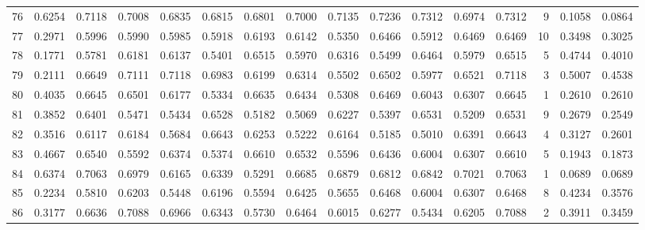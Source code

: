 \begin{tabular}{lrrrrrrrrrrrrrrr}
76  &      0.6254 &  0.7118 &  0.7008 &  0.6835 &  0.6815 &  0.6801 &  0.7000 &  0.7135 &  0.7236 &  0.7312 &   0.6974 &     0.7312 &      9 &                    0.1058 &                     0.0864 \\
77  &      0.2971 &  0.5996 &  0.5990 &  0.5985 &  0.5918 &  0.6193 &  0.6142 &  0.5350 &  0.6466 &  0.5912 &   0.6469 &     0.6469 &     10 &                    0.3498 &                     0.3025 \\
78  &      0.1771 &  0.5781 &  0.6181 &  0.6137 &  0.5401 &  0.6515 &  0.5970 &  0.6316 &  0.5499 &  0.6464 &   0.5979 &     0.6515 &      5 &                    0.4744 &                     0.4010 \\
79  &      0.2111 &  0.6649 &  0.7111 &  0.7118 &  0.6983 &  0.6199 &  0.6314 &  0.5502 &  0.6502 &  0.5977 &   0.6521 &     0.7118 &      3 &                    0.5007 &                     0.4538 \\
80  &      0.4035 &  0.6645 &  0.6501 &  0.6177 &  0.5334 &  0.6635 &  0.6434 &  0.5308 &  0.6469 &  0.6043 &   0.6307 &     0.6645 &      1 &                    0.2610 &                     0.2610 \\
81  &      0.3852 &  0.6401 &  0.5471 &  0.5434 &  0.6528 &  0.5182 &  0.5069 &  0.6227 &  0.5397 &  0.6531 &   0.5209 &     0.6531 &      9 &                    0.2679 &                     0.2549 \\
82  &      0.3516 &  0.6117 &  0.6184 &  0.5684 &  0.6643 &  0.6253 &  0.5222 &  0.6164 &  0.5185 &  0.5010 &   0.6391 &     0.6643 &      4 &                    0.3127 &                     0.2601 \\
83  &      0.4667 &  0.6540 &  0.5592 &  0.6374 &  0.5374 &  0.6610 &  0.6532 &  0.5596 &  0.6436 &  0.6004 &   0.6307 &     0.6610 &      5 &                    0.1943 &                     0.1873 \\
84  &      0.6374 &  0.7063 &  0.6979 &  0.6165 &  0.6339 &  0.5291 &  0.6685 &  0.6879 &  0.6812 &  0.6842 &   0.7021 &     0.7063 &      1 &                    0.0689 &                     0.0689 \\
85  &      0.2234 &  0.5810 &  0.6203 &  0.5448 &  0.6196 &  0.5594 &  0.6425 &  0.5655 &  0.6468 &  0.6004 &   0.6307 &     0.6468 &      8 &                    0.4234 &                     0.3576 \\
86  &      0.3177 &  0.6636 &  0.7088 &  0.6966 &  0.6343 &  0.5730 &  0.6464 &  0.6015 &  0.6277 &  0.5434 &   0.6205 &     0.7088 &      2 &                    0.3911 &                     0.3459 \\

\end{tabular}
